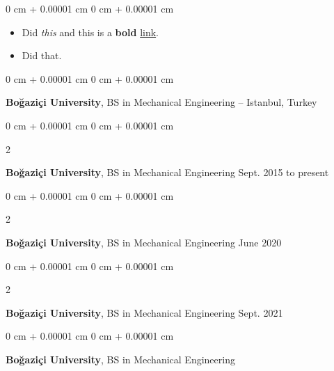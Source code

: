 \documentclass[10pt, letterpaper]{article}
\newenvironment{highlights}{
    \begin{itemize}[
        topsep=0.10 cm,
        parsep=0.10 cm,
        partopsep=0pt,
        itemsep=0pt,
        leftmargin=0 cm + 10pt
    ]
}{
    \end{itemize}
} %
\newenvironment{onecolentry}{
    \begin{adjustwidth}{
        0 cm + 0.00001 cm
    }{
        0 cm + 0.00001 cm
    }
}{
    \end{adjustwidth}
} %
\newenvironment{twocolentry}[2][]{
    \onecolentry
    \def\secondColumn{#2}
    \setcolumnwidth{\fill, 4.5 cm}
    \begin{paracol}{2}
}{
    \switchcolumn \raggedleft \secondColumn
    \end{paracol}
    \endonecolentry
} %
\begin{document}
        \vspace{0.10 cm}
        \begin{onecolentry}
            \begin{highlights}
                \item Did \textit{this} and this is a \textbf{bold} \href{https://example.com}{link}.
                \item Did that.
            \end{highlights}
        \end{onecolentry}


        \vspace{0.2 cm}

        \begin{onecolentry}
            \textbf{Boğaziçi University}, BS in Mechanical Engineering -- Istanbul, Turkey\end{onecolentry}



        \vspace{0.2 cm}

        \begin{twocolentry}{
            Sept. 2015 to present
        }
            \textbf{Boğaziçi University}, BS in Mechanical Engineering\end{twocolentry}



        \vspace{0.2 cm}

        \begin{twocolentry}{
            June 2020
        }
            \textbf{Boğaziçi University}, BS in Mechanical Engineering\end{twocolentry}



        \vspace{0.2 cm}

        \begin{twocolentry}{
            Sept. 2021
        }
            \textbf{Boğaziçi University}, BS in Mechanical Engineering\end{twocolentry}



        \vspace{0.2 cm}

        \begin{onecolentry}
            \textbf{Boğaziçi University}, BS in Mechanical Engineering\end{onecolentry}
\end{document}
